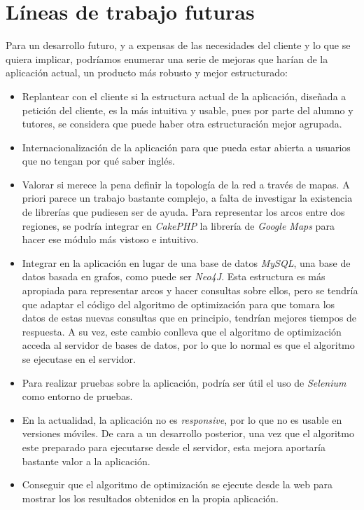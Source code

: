 \section{Líneas de trabajo futuras}

Para un desarrollo futuro, y a expensas de las necesidades del cliente y lo que se quiera implicar, podríamos enumerar una serie de mejoras que harían de la aplicación actual, un producto más robusto y mejor estructurado:

\begin{itemize}
	
	\item Replantear con el cliente si la estructura actual de la aplicación, diseñada a petición del cliente, es la más intuitiva y usable, pues por parte del alumno y tutores, se considera que puede haber otra estructuración mejor agrupada.
	
	\item Internacionalización de la aplicación para que pueda estar abierta a usuarios que no tengan por qué saber inglés.
	
	\item Valorar si merece la pena definir la topología de la red a través de mapas. A priori parece un trabajo bastante complejo, a falta de investigar la existencia de librerías que pudiesen ser de ayuda. Para representar los arcos entre dos regiones, se podría integrar en \textit{CakePHP} la librería de \textit{Google Maps} para hacer ese módulo más vistoso e intuitivo.
	
	\item Integrar en la aplicación en lugar de una base de datos \textit{MySQL}, una base de datos basada en grafos, como puede ser \textit{Neo4J}. Esta estructura es más apropiada para representar arcos y hacer consultas sobre ellos, pero se tendría que adaptar el código del algoritmo de optimización para que tomara los datos de estas nuevas consultas que en principio, tendrían mejores tiempos de respuesta. A su vez, este cambio conlleva que el algoritmo de optimización acceda al servidor de bases de datos, por lo que lo normal es que el algoritmo se ejecutase en el servidor.
	
	\item Para realizar pruebas sobre la aplicación, podría ser útil el uso de \textit{Selenium} como entorno de pruebas.
	
	\item En la actualidad, la aplicación no es \textit{responsive}, por lo que no es usable en versiones móviles. De cara a un desarrollo posterior, una vez que el algoritmo este preparado para ejecutarse desde el servidor, esta mejora aportaría bastante valor a la aplicación.
	
	\item Conseguir que el algoritmo de optimización se ejecute desde la web para mostrar los los resultados obtenidos en la propia aplicación.
	
\end{itemize}


